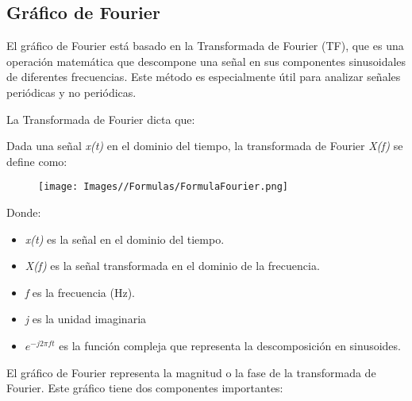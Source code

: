 \documentclass{article}
\begin{document}
\subsection{Gráfico de Fourier}
El gráfico de Fourier está basado en la Transformada de Fourier (TF), que es una operación matemática que descompone una señal en sus componentes sinusoidales de diferentes frecuencias. Este método es especialmente útil para analizar señales periódicas y no periódicas.

La Transformada de Fourier dicta que: 

Dada una señal \textit{x(t)} en el dominio del tiempo, la transformada de Fourier \textit{X(f)} se define como:

\begin{figure}[H]
    \centering
    \texttt{[image: Images//Formulas/FormulaFourier.png]}
\end{figure}

\newpage
Donde:
\begin{itemize}
    \item \textit{x(t)} es la señal en el dominio del tiempo.
    \item \textit{X(f)} es la señal transformada en el dominio de la frecuencia.
    \item \textit{f} es la frecuencia (Hz).
    \item \textit{j} es la unidad imaginaria 
    \item $e^{-j2\pi ft}$ es la función compleja que representa la descomposición en sinusoides.

\end{itemize}

El gráfico de Fourier representa la magnitud o la fase de la transformada de Fourier. Este gráfico tiene dos componentes importantes:

\end{document}
